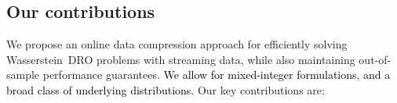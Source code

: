 \documentclass[12pt]{article}
\newcommand{\bnote}[1]{\textcolor{purple}{\textbf{[B: #1]}}}
\newcommand{\RC}[1]{\textcolor{black}{#1}}
\newcommand{\RC}[1]{\textcolor{blue}{#1}}
\begin{document}

\subsection{Our contributions}%
\label{sub:our_contributions}
We propose an {\rm online data compression approach} for efficiently solving Wasserstein~\gls{DRO} problems with streaming data, while also maintaining out-of-sample performance guarantees.
\RC{We allow for mixed-integer formulations, and a broad class of underlying distributions.}
Our key contributions are:
\end{document}
